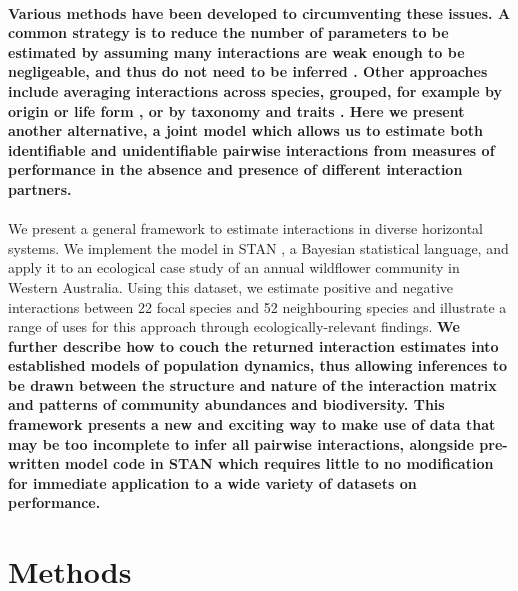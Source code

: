 \documentclass[a4,12pt]{article}
\begin{document}
\begin{refsection}
    \paragraph{} %
    \textbf{Various methods have been developed to circumventing these issues. A common strategy is to reduce the number of parameters to be estimated by assuming many interactions are weak enough to be negligeable, and thus do not need to be inferred \parencite{Weiss-Lehman2022}. Other approaches include averaging interactions across species, grouped, for example by origin or life form \parencite{Martyn2021}, or by taxonomy and traits \parencite{Uriarte2004}. Here we present another alternative, a joint model which allows us to estimate both identifiable and unidentifiable pairwise interactions from measures of performance in the absence and presence of different interaction partners.}

    \paragraph{} 
    We present a general framework to estimate interactions in diverse horizontal systems. We implement the model in STAN \parencite{Carpenter2017}, a Bayesian statistical language, and apply it to an ecological case study of an annual wildflower community in Western Australia. Using this dataset, we estimate positive and negative interactions between 22 focal species and 52 neighbouring species and illustrate a range of uses for this approach through ecologically-relevant findings. \textbf{We further describe how to couch the returned interaction estimates into established models of population dynamics, thus allowing inferences to be drawn between the structure and nature of the interaction matrix and patterns of community abundances and biodiversity. This framework presents a new and exciting way to make use of data that may be too incomplete to infer all pairwise interactions, alongside pre-written model code in STAN which requires little to no modification for immediate application to a wide variety of datasets on performance.}


\section{Methods}


\end{refsection}
\end{document}
